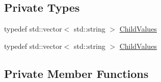 \subsection*{Private Types}
\begin{DoxyCompactItemize}
\item 
typedef std\-::vector$<$ std\-::string $>$ \hyperlink{classJson_1_1StyledStreamWriter_ad0e42dda934aaee87fa9434c30186a9b}{Child\-Values}
\item 
typedef std\-::vector$<$ std\-::string $>$ \hyperlink{classJson_1_1StyledStreamWriter_ad0e42dda934aaee87fa9434c30186a9b}{Child\-Values}
\end{DoxyCompactItemize}
\subsection*{Private Member Functions}
